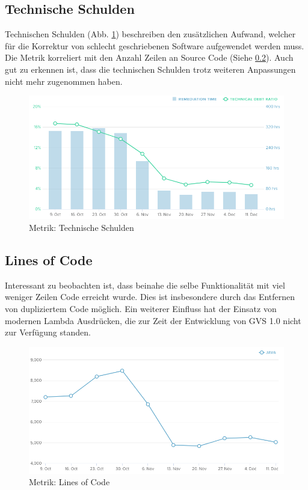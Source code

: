 \documentclass[11pt,a4paper,english,oneside]{book}
\numberwithin{equation}{chapter}
\begin{document}
	\subsection{Technische Schulden}
	Technischen Schulden (Abb. \ref{fig:metric-technical-debt}) beschreiben den zusätzlichen Aufwand, welcher für die Korrektur von schlecht geschriebenen Software aufgewendet werden muss. Die Metrik korreliert mit den Anzahl Zeilen an Source Code (Siehe \ref{ssec:lines-code}). Auch gut zu erkennen ist, dass die technischen Schulden trotz weiteren Anpassungen nicht mehr zugenommen haben.
	\begin{figure}[h!]
		\centering
		\includegraphics[width=\linewidth]{assets/images/metrics/technical_debt}
		\caption{Metrik: Technische Schulden}
		\label{fig:metric-technical-debt}
	\end{figure}
	
	\subsection{Lines of Code} \label{ssec:lines-code}
	Interessant zu beobachten ist, dass beinahe die selbe Funktionalität mit viel weniger Zeilen Code erreicht wurde. Dies ist insbesondere durch das Entfernen von dupliziertem Code möglich. Ein weiterer Einfluss hat der Einsatz von modernen Lambda Ausdrücken, die zur Zeit der Entwicklung von GVS 1.0 nicht zur Verfügung standen.
	\begin{figure}[h!]
		\centering
		\includegraphics[width=\linewidth]{assets/images/metrics/lines_of_code}
		\caption{Metrik: Lines of Code}
		\label{metric-linesofcode}
	\end{figure}	
\end{document}
